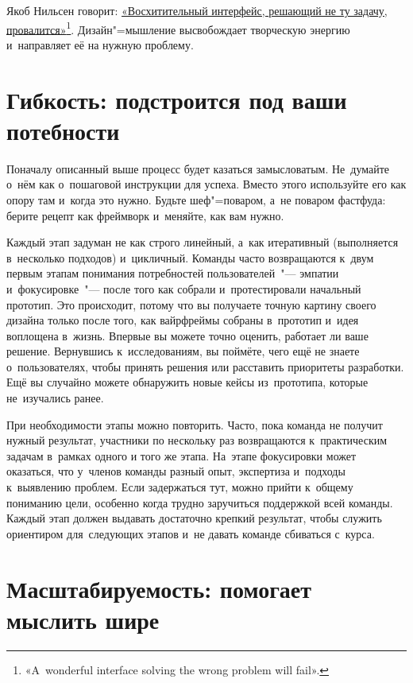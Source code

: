 \documentclass[12pt]{article}
\begin{document}
Якоб Нильсен говорит: \href{https://www.nngroup.com/articles/the-myth-of-the-genius-designer/}{«Восхитительный интерфейс, решающий не ту задачу, \mbox{провалится»}\footnote{«A~wonderful interface solving the wrong problem will fail».}}. Дизайн"=мышление высвобождает творческую энергию и~направляет её на нужную проблему.

\section{Гибкость: подстроится под ваши потебности}

Поначалу описанный выше процесс будет казаться замысловатым. Не~думайте о~нём как о~пошаговой инструкции для успеха. Вместо этого используйте его как опору там и~когда это нужно. Будьте шеф"=поваром, а~не поваром фастфуда: берите рецепт как фреймворк и~меняйте, как вам нужно.

Каждый этап задуман не как строго линейный, а~как итеративный (выполняется в~несколько подходов) и~цикличный. Команды часто возвращаются к~двум первым этапам понимания потребностей пользователей~"--- эмпатии и~фокусировке~"--- после того как собрали и~протестировали начальный прототип. Это происходит, потому что вы получаете точную картину своего дизайна только после того, как вайрфреймы собраны в~прототип и~идея воплощена в~жизнь. Впервые вы можете точно оценить, работает ли ваше решение. Вернувшись к~исследованиям, вы поймёте, чего ещё не знаете о~пользователях, чтобы принять решения или расставить приоритеты разработки. Ещё вы случайно можете обнаружить новые кейсы из~прототипа, которые не~изучались ранее.

При необходимости этапы можно повторить. Часто, пока команда не получит нужный результат, участники по нескольку раз возвращаются к~практическим задачам в~рамках одного и того же этапа. На~этапе фокусировки может оказаться, что у~членов команды разный опыт, экспертиза и~подходы к~выявлению проблем. Если задержаться тут, можно прийти к~общему пониманию цели, особенно когда трудно заручиться поддержкой всей команды. Каждый этап должен выдавать достаточно крепкий результат, чтобы служить ориентиром для~следующих этапов и~не давать команде сбиваться с~курса.

\section{Масштабируемость: помогает мыслить шире}
\end{document}
